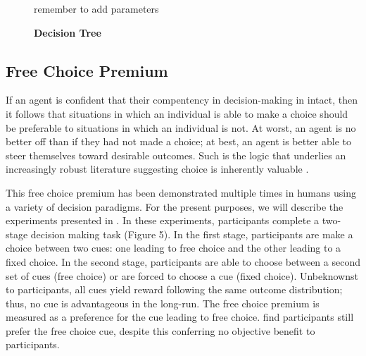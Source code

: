 \documentclass[11pt]{article} %
\begin{document}
\begin{figure}
  \centerline{%
  }
  \caption{\textbf{Decision Tree}}
  \par remember to add parameters
\end{figure}

\subsection{Free Choice Premium}

If an agent is confident that their compentency in decision-making in intact,
then it follows that situations in which an individual is able to make a choice
should be preferable to situations in which an individual is not. At worst,
an agent is no better off than if they had not made a choice; at best, an agent
is better able to steer themselves toward desirable outcomes. Such is the logic
that underlies an increasingly robust literature suggesting choice is inherently
valuable \citep{Leotti2010}.

This free choice premium has been demonstrated multiple times in humans \citep{Suzuki1997,Leotti2011,Leotti2014,Cockburn2014} using a variety of decision
paradigms. For the present purposes, we will describe the experiments presented in
\citep{Leotti2011,Leotti2014}. In these experiments, participants complete a
two-stage decision making task (Figure 5). In the first stage, participants are
make a choice between two cues: one leading to free choice and the other leading
to a fixed choice. In the second stage, participants are able to choose between
a second set of cues (free choice) or are forced to choose a cue (fixed choice).
Unbeknownst to participants, all cues yield reward following the same outcome
distribution; thus, no cue is advantageous in the long-run. The free choice
premium is measured as a preference for the cue leading to free choice. \cite{Leotti2011,Leotti2014}
find participants still prefer the free choice cue, despite this conferring no
objective benefit to participants.
\end{document}

